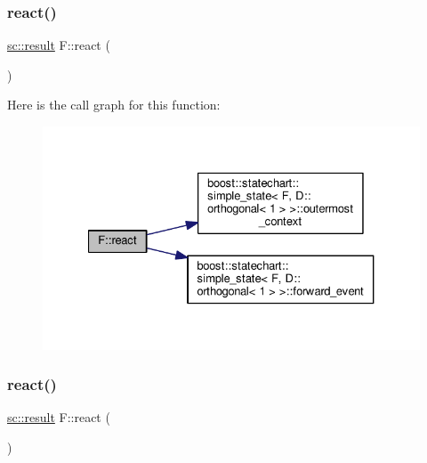 \subsubsection{\texorpdfstring{react()}{react()}\hspace{0.1cm}{\footnotesize\ttfamily [3/4]}}
{\footnotesize\ttfamily \mbox{\hyperlink{namespaceboost_1_1statechart_abe807f6598b614d6d87bb951ecd92331}{sc\+::result}} F\+::react (\begin{DoxyParamCaption}\item[{const \mbox{\hyperlink{struct_ev_discard_in_b}{Ev\+Discard\+InB}} \&}]{ }\end{DoxyParamCaption})\hspace{0.3cm}{\ttfamily [inline]}}

Here is the call graph for this function\+:
\nopagebreak
\begin{figure}[H]
\begin{center}
\leavevmode
\includegraphics[width=327pt]{struct_f_abe8ebe7d32d3149a3c8623245b4c5c42_cgraph}
\end{center}
\end{figure}
\mbox{\label{struct_f_a31458675be8c5ab2c2bfb59512386c72}} 
\subsubsection{\texorpdfstring{react()}{react()}\hspace{0.1cm}{\footnotesize\ttfamily [4/4]}}
{\footnotesize\ttfamily \mbox{\hyperlink{namespaceboost_1_1statechart_abe807f6598b614d6d87bb951ecd92331}{sc\+::result}} F\+::react (\begin{DoxyParamCaption}\item[{const \mbox{\hyperlink{struct_ev_discard_in_d}{Ev\+Discard\+InD}} \&}]{ }\end{DoxyParamCaption})\hspace{0.3cm}{\ttfamily [inline]}}

